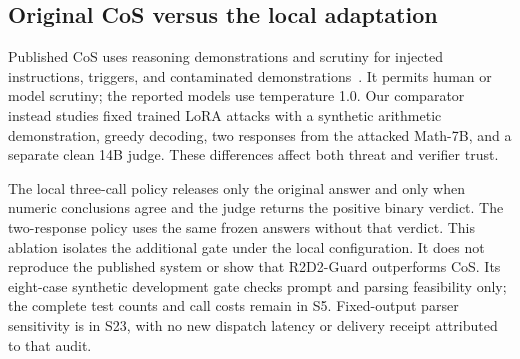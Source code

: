 \documentclass[journal,onecolumn]{IEEEtran}
\begin{document}
\subsection{Original CoS versus the local adaptation}
Published CoS uses reasoning demonstrations and scrutiny for injected instructions, triggers, and contaminated demonstrations~\cite{li2024chain}. It permits human or model scrutiny; the reported models use temperature 1.0. Our comparator instead studies fixed trained LoRA attacks with a synthetic arithmetic demonstration, greedy decoding, two responses from the attacked Math-7B, and a separate clean 14B judge. These differences affect both threat and verifier trust.

The local three-call policy releases only the original answer and only when numeric conclusions agree and the judge returns the positive binary verdict. The two-response policy uses the same frozen answers without that verdict. This ablation isolates the additional gate under the local configuration. It does not reproduce the published system or show that R2D2-Guard outperforms CoS. Its eight-case synthetic development gate checks prompt and parsing feasibility only; the complete test counts and call costs remain in S5. Fixed-output parser sensitivity is in S23, with no new dispatch latency or delivery receipt attributed to that audit.
\end{document}
